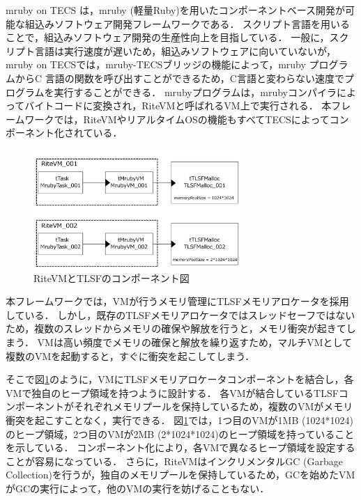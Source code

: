 \documentclass[submit,techrep]{ipsj_v2/UTF8/ipsj}
\begin{document}
mruby on TECS は，mruby (軽量Ruby)\cite{par:mruby}\cite{url:mruby}を用いたコンポーネントベース開発が可能な組込みソフトウェア開発フレームワークである\cite{par:mrubyonTECS}\cite{par:mrubyonTECS2}．
スクリプト言語を用いることで，組込みソフトウェア開発の生産性向上を目指している．
一般に，スクリプト言語は実行速度が遅いため，組込みソフトウェアに向いていないが，mruby on TECSでは，mruby-TECSブリッジの機能によって，mruby プログラムからC 言語の関数を呼び出すことができるため，C言語と変わらない速度でプログラムを実行することができる．
mrubyプログラムは，mrubyコンパイラによってバイトコードに変換され，RiteVMと呼ばれるVM上で実行される．
本フレームワークでは，RiteVMやリアルタイムOSの機能もすべてTECSによってコンポーネント化されている．



\begin{figure}[t]
    \centering
    \includegraphics[width=8cm,clip]{figure/UseCase_mruby.pdf}
    \caption{RiteVMとTLSFのコンポーネント図}
    \label{fig:UseCase_mruby}
\end{figure}

本フレームワークでは，VMが行うメモリ管理にTLSFメモリアロケータを採用している．
しかし，既存のTLSFメモリアロケータではスレッドセーフではないため，複数のスレッドからメモリの確保や解放を行うと，メモリ衝突が起きてしまう．
VMは高い頻度でメモリの確保と解放を繰り返すため，マルチVMとして複数のVMを起動すると，すぐに衝突を起こしてしまう．

そこで図\ref{fig:UseCase_mruby}のように，VMにTLSFメモリアロケータコンポーネントを結合し，各VMで独自のヒープ領域を持つように設計する．
各VMが結合しているTLSFコンポーネントがそれぞれメモリプールを保持しているため，複数のVMがメモリ衝突を起こすことなく，実行できる．
図\ref{fig:UseCase_mruby}では，1つ目のVMが1MB (1024*1024)のヒープ領域，2つ目のVMが2MB (2*1024*1024)のヒープ領域を持っていることを示している．
コンポーネント化により，各VMで異なるヒープ領域を設定することが容易になっている．
さらに，RiteVMはインクリメンタルGC (Garbage Collection)を行うが，独自のメモリプールを保持しているため，GCを始めたVMがGCの実行によって，他のVMの実行を妨げることもない．
    
\end{document}
